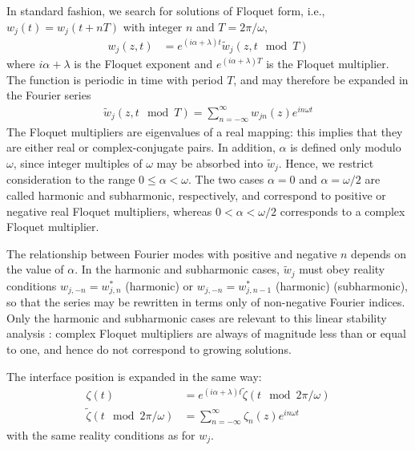 \documentclass[prfluids]{revtex4-2}
\begin{document}
In standard fashion, we search for solutions of Floquet form, i.e.,
$w_j(t)=w_j(t+nT)$ with integer $n$ and $T=2\pi/\omega$, 
\begin{align}
  \label{eq4}
  w_j (z,t) &= e^{(i\alpha+\lambda)t} \tilde{w}_j (z, t \mod T)
\end{align}
where $i\alpha+\lambda$ is the Floquet exponent and
$e^{(i\alpha + \lambda)T}$ is the Floquet multiplier. The function is
periodic in time with period $T$, and may therefore be expanded in the
Fourier series
\begin{align}
  \label{eq5}
  \tilde{w}_j (z, t \mod T) = \sum_{n=-\infty}^{\infty} w_{jn}(z) e^{in\omega t}
\end{align}
The Floquet multipliers are eigenvalues of a real mapping: this implies that
they are either real or complex-conjugate pairs. In addition, $\alpha$ is
defined only modulo $\omega$, since integer multiples of $\omega$ may be
absorbed into $\tilde{w}_j$. Hence, we restrict consideration to the range $0
\leq \alpha < \omega$. The two cases $\alpha = 0$ and $\alpha = \omega/2$ are
called harmonic and subharmonic, respectively, and correspond to positive or
negative real Floquet multipliers, whereas $0 < \alpha < \omega/2$ corresponds
to a complex Floquet multiplier.

The relationship between Fourier modes with positive and negative $n$ depends on
the value of $\alpha$. In the harmonic and subharmonic cases, $\tilde{w}_j$ must
obey reality conditions $w_{j,-n} = w_{j,n}^*$ (harmonic) or $w_{j,-n} =
w_{j,n-1}^*$ (harmonic) (subharmonic), so that the series may be rewritten in
terms only of non-negative Fourier indices. Only the harmonic and subharmonic
cases are relevant to this linear stability analysis : complex Floquet
multipliers are always of magnitude less than or equal to one, and hence do not
correspond to growing solutions. 

The interface position is expanded in the same way:
\begin{subequations}
  \begin{align}
    \label{eq6a}
    \zeta(t) &= e^{(i\alpha+\lambda)t} \tilde{\zeta} (t \mod 2\pi/\omega)
    \\
    \label{eq6b}
    \tilde{\zeta} (t \mod 2\pi/\omega) &= \sum_{n=-\infty}^{\infty} \zeta_{n}(z) e^{in\omega t}
  \end{align}
\end{subequations}
with the same reality conditions as for $w_j$.
\end{document}
